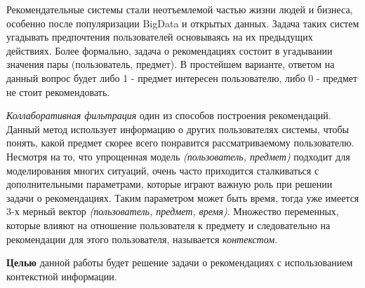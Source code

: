 
\setcounter{page}{5}

Рекомендательные системы стали неотъемлемой частью жизни людей и бизнеса, особенно после популяризации BigData и открытых данных. Задача таких систем угадывать предпочтения пользователей основываясь на их предыдущих действиях. Более формально, задача о рекомендациях состоит в угадывании значения пары (пользователь, предмет). В простейшем варианте, ответом на данный вопрос будет либо 1 - предмет интересен пользователю, либо 0 - предмет не стоит рекомендовать.\par \textit{Коллаборативная фильтрация} один из способов построения рекомендаций. Данный метод использует информацию о других пользователях системы, чтобы понять, какой предмет скорее всего понравится рассматриваемому пользователю. Несмотря на то, что упрощенная модель \textit{(пользователь, предмет)} подходит для моделирования многих ситуаций, очень часто приходится сталкиваться с дополнительными параметрами, которые играют важную роль при решении задачи о рекомендациях. Таким параметром может быть время, тогда уже имеется 3-х мерный вектор \textit{(пользователь, предмет, время)}. Множество переменных, которые влияют на отношение пользователя к предмету и следовательно на рекомендации для этого пользователя, называется \textit{контекстом}. 

\textbf{Целью} данной работы будет решение задачи о рекомендациях с использованием контекстной информации.